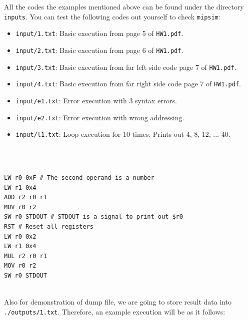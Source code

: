 \documentclass{homework}
\begin{document}
All the codes the examples mentioned above can be found under the directory \texttt{inputs}. You can test the following codes out yourself to check \texttt{mipsim}:
\begin{itemize}
    \item \texttt{input/1.txt}: Basic execution from page 5 of \texttt{HW1.pdf}.
    \item \texttt{input/2.txt}: Basic execution from page 6 of \texttt{HW1.pdf}.
    \item \texttt{input/3.txt}: Basic execution from far left side code page 7 of \texttt{HW1.pdf}.
    \item \texttt{input/4.txt}: Basic execution from far right side code page 7 of \texttt{HW1.pdf}.
    \item \texttt{input/e1.txt}: Error execution with 3 syntax errors.
    \item \texttt{input/e2.txt}: Error execution with wrong addressing.
    \item \texttt{input/l1.txt}: Loop execution for 10 times. Prints out 4, 8, 12, ... 40.
\end{itemize}
\\
\\
\begin{center}
\begin{code}
\begin{verbatim}
LW r0 0xF # The second operand is a number
LW r1 0x4
ADD r2 r0 r1
MOV r0 r2
SW r0 STDOUT # STDOUT is a signal to print out $r0
RST # Reset all registers
LW r0 0x2
LW r1 0x4
MUL r2 r0 r1
MOV r0 r2
SW r0 STDOUT
\end{verbatim}
\end{code}
\end{center}
\\
Also for demonstration of dump file, we are going to store result data into \texttt{./outputs/1.txt}. Therefore, an example execution will be as it follows:
\\
\end{document}
